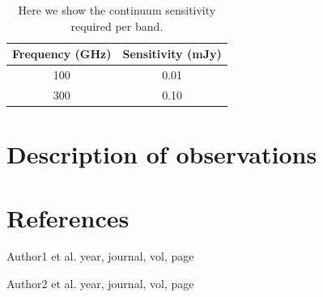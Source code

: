 \documentclass{alma_proposal}
\begin{document}


\begin{table}[tbh]
\begin{center}
\caption[]{Here we show the continuum sensitivity required per band.}
\begin{tabular}{cc}
\hline \noalign {\smallskip}
Frequency (GHz) & Sensitivity (mJy) \\
\hline \noalign {\smallskip}
100 & 0.01 \\
300 & 0.10 \\
\end{tabular}
\end{center}
\end{table}

\section{Description of observations}




\section{References}


\noindent [1] Author1 et al. year, journal, vol, page

\noindent [2] Author2 et al. year, journal, vol, page


\end{document}
